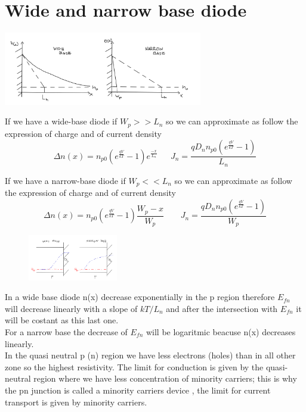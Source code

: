 \section{Wide and narrow base diode}

\centering
\includegraphics[width=0.65\textwidth]{pn12.png}\\
\raggedright

If we have a wide-base diode if $W_p>>L_n$ so we can approximate as follow the expression of charge and of current density 
\begin{equation}
\Delta n(x)=n_{p0}(e^{\frac{qV}{kT}}-1)e^{\frac{-x}{L_n}} \ \ \ \ \ \ \ J_n=\frac{qD_nn_{p0}(e^{\frac{qV}{kT}}-1)}{L_n}
\end{equation}


If we have a narrow-base diode if $W_p<<L_n$ so we can approximate as follow the expression of charge and of current density
\begin{equation}
\Delta n(x)=n_{p0}(e^{\frac{qV}{kT}}-1)\frac{W_p-x}{W_p}\ \ \ \ \ \ \ \ \ J_n=\frac{qD_nn_{p0}(e^{\frac{qV}{kT}}-1)}{W_p}
\end{equation}


\begin{figure}
\includegraphics[width=0.35\textwidth]{wbnb.png}
\end{figure}

In a wide base diode n(x) decrease exponentially in the p region therefore $E_{fn}$ will decrease linearly with a slope of $kT/L_n$ and after the intersection with $E_{fn}$ it will be costant as this last one.\\
For a narrow base the decrease of $E_{fn}$ will be logaritmic beacuse n(x) decreases linearly.\\
In the quasi neutral p (n) region we have less electrons (holes) than in all other zone so the highest resistivity. The limit for conduction is given by the quasi-neutral region where we have less concentration of minority carriers; this is why the pn junction is called a minority carriers device , the limit for current transport is given by minority carriers.\\

